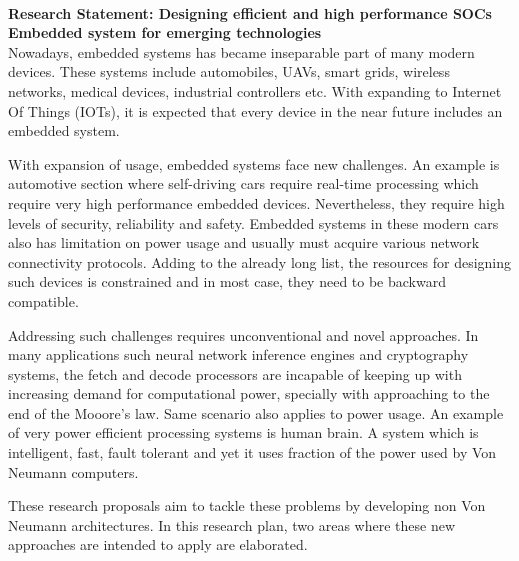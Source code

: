 \documentclass[12pt,oneside]{book}
\begin{document}
\thispagestyle{empty}
 \thispagestyle{empty}
 \phantom \quad \\

{\bf Research Statement: 
Designing efficient and high performance SOCs  Embedded system for emerging technologies
}
\vspace*{2\baselineskip}\\
Nowadays, embedded systems has became inseparable part of many modern devices. These systems include automobiles, UAVs, smart grids, wireless networks, medical devices, industrial controllers etc. With expanding to Internet Of Things (IOTs), it is expected that every device in the near future includes an embedded system. 

With expansion of usage, embedded systems face new challenges. An example is automotive section where self-driving cars require real-time processing which require very high performance embedded devices. Nevertheless, they require high levels of security, reliability and safety. Embedded systems in these modern cars also has limitation on power usage and usually must acquire various network connectivity protocols. Adding to the already long list, the resources for designing such devices is constrained and in most case, they need to be backward compatible. 


Addressing such challenges requires unconventional and novel approaches. In many applications such neural network inference engines and cryptography systems, the fetch and decode processors are incapable of keeping up with increasing demand for computational power, specially with approaching to the end of the Mooore's law. Same scenario also applies to power usage. An example of very power efficient  processing systems is human brain. A system which is intelligent, fast, fault tolerant and yet it uses fraction of the power used by Von Neumann computers. 

These research proposals aim to tackle these problems by developing non Von Neumann architectures. In this research plan, two areas where these new approaches are intended to apply are elaborated. \\
 
 
 
\end{document}
